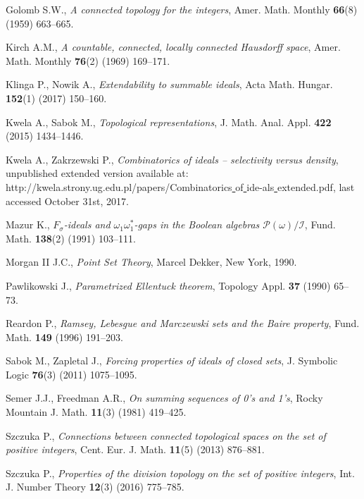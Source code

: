 \documentclass{amsart}
\theoremstyle{definition}
\theoremstyle{definition}
\begin{document}
\begin{thebibliography}{abc}
Golomb S.W., \emph{A connected topology for the integers},
Amer. Math. Monthly {\bf 66}(8) (1959) 663--665.

Kirch A.M., \emph{A countable, connected, locally connected Hausdorff space},
Amer. Math. Monthly {\bf 76}(2) (1969) 169--171.


Klinga P., Nowik A., \emph{Extendability to summable ideals},
Acta Math. Hungar. {\bf 152}(1) (2017) 150--160.

Kwela A., Sabok M., \emph{Topological representations},
J. Math. Anal. Appl. {\bf 422} (2015) 1434--1446.

Kwela A., Zakrzewski P., \emph{Combinatorics of ideals -- selectivity versus density}, unpublished extended version available at:
http://kwela.strony.ug.edu.pl/papers/Combinatorics\underline{ }of\underline{ }ide-als\underline{ }extended.pdf,
last accessed October 31st, 2017.

Mazur K., \emph{$F_\sigma$-ideals and $\omega_1\omega_1^*$-gaps in the Boolean algebras $\mathcal{P}(\omega)/\mathcal{I}$},
Fund. Math. {\bf 138}(2) (1991) 103--111.

Morgan II J.C., \emph{Point Set Theory},
Marcel Dekker, New York, 1990.

Pawlikowski J., \emph{Parametrized Ellentuck theorem},
Topology Appl. {\bf 37} (1990) 65--73.

Reardon P., \emph{Ramsey, Lebesgue and Marczewski sets and the Baire property},
Fund. Math. {\bf 149} (1996) 191--203.

Sabok M., Zapletal J., \emph{Forcing  properties  of  ideals  of  closed  sets}, 
J. Symbolic Logic {\bf 76}(3) (2011) 1075--1095.

Semer J.J., Freedman A.R., \emph{On summing sequences of 0’s and 1’s},
Rocky Mountain J. Math. {\bf 11}(3) (1981) 419--425.

Szczuka P., \emph{Connections between connected topological spaces on the set of positive integers}, 
Cent. Eur. J. Math. {\bf 11}(5) (2013) 876--881.

Szczuka P., \emph{Properties of the division topology on the set of positive integers},
Int. J. Number Theory {\bf 12}(3) (2016) 775--785.


\end{thebibliography}
\end{document}
